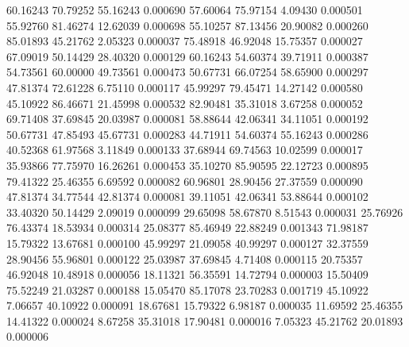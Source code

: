        60.16243       70.79252       55.16243       0.000690
       57.60064       75.97154        4.09430       0.000501
       55.92760       81.46274       12.62039       0.000698
       55.10257       87.13456       20.90082       0.000260
       85.01893       45.21762        2.05323       0.000037
       75.48918       46.92048       15.75357       0.000027
       67.09019       50.14429       28.40320       0.000129
       60.16243       54.60374       39.71911       0.000387
       54.73561       60.00000       49.73561       0.000473
       50.67731       66.07254       58.65900       0.000297
       47.81374       72.61228        6.75110       0.000117
       45.99297       79.45471       14.27142       0.000580
       45.10922       86.46671       21.45998       0.000532
       82.90481       35.31018        3.67258       0.000052
       69.71408       37.69845       20.03987       0.000081
       58.88644       42.06341       34.11051       0.000192
       50.67731       47.85493       45.67731       0.000283
       44.71911       54.60374       55.16243       0.000286
       40.52368       61.97568        3.11849       0.000133
       37.68944       69.74563       10.02599       0.000017
       35.93866       77.75970       16.26261       0.000453
       35.10270       85.90595       22.12723       0.000895
       79.41322       25.46355        6.69592       0.000082
       60.96801       28.90456       27.37559       0.000090
       47.81374       34.77544       42.81374       0.000081
       39.11051       42.06341       53.88644       0.000102
       33.40320       50.14429        2.09019       0.000099
       29.65098       58.67870        8.51543       0.000031
       25.76926       76.43374       18.53934       0.000314
       25.08377       85.46949       22.88249       0.001343
       71.98187       15.79322       13.67681       0.000100
       45.99297       21.09058       40.99297       0.000127
       32.37559       28.90456       55.96801       0.000122
       25.03987       37.69845        4.71408       0.000115
       20.75357       46.92048       10.48918       0.000056
       18.11321       56.35591       14.72794       0.000003
       15.50409       75.52249       21.03287       0.000188
       15.05470       85.17078       23.70283       0.001719
       45.10922        7.06657       40.10922       0.000091
       18.67681       15.79322        6.98187       0.000035
       11.69592       25.46355       14.41322       0.000024
	8.67258       35.31018       17.90481       0.000016
	7.05323       45.21762       20.01893       0.000006
